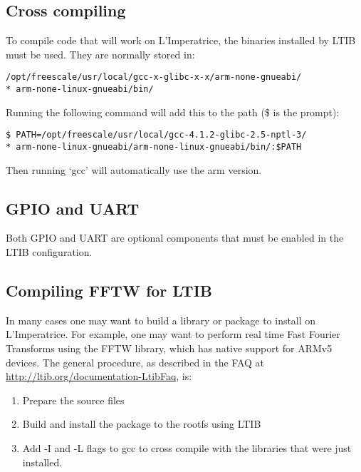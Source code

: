 	\subsection{Cross compiling} %
	\label{apdx:cross_compiling}
		To compile code that will work on L'Imperatrice, the binaries installed by LTIB must be used.  They are normally stored in:

		\texttt{/opt/freescale/usr/local/gcc-x-glibc-x-x/arm-none-gnueabi/\\*
		arm-none-linux-gnueabi/bin/}
		  
		Running the following command will add this to the path (\$ is the prompt):

		\texttt{\$ PATH=/opt/freescale/usr/local/gcc-4.1.2-glibc-2.5-nptl-3/\\*
		arm-none-linux-gnueabi/arm-none-linux-gnueabi/bin/:\$PATH}

		Then running `gcc' will automatically use the arm version.


	\subsection{GPIO and UART} %
	\label{apdx:gpio_and_uart}
		Both GPIO and UART are optional components that must be enabled in the LTIB configuration.  


	\subsection{Compiling FFTW for LTIB} %
	\label{apdx:compiling_fftw_for_ltib}
		In many cases one may want to build a library or package to install on L'Imperatrice.  For example, one may want to perform real time Fast Fourier Transforms using the FFTW library, which has native support for ARMv5 devices.  The general procedure, as described in the FAQ at \href{http://ltib.org/documentation-LtibFaq}{http://ltib.org/documentation-LtibFaq}, is:
		\begin{enumerate}
			\item Prepare the source files
			\item Build and install the package to the rootfs using LTIB
			\item Add -I and -L flags to gcc to cross compile with the libraries that were just installed.
		\end{enumerate}

